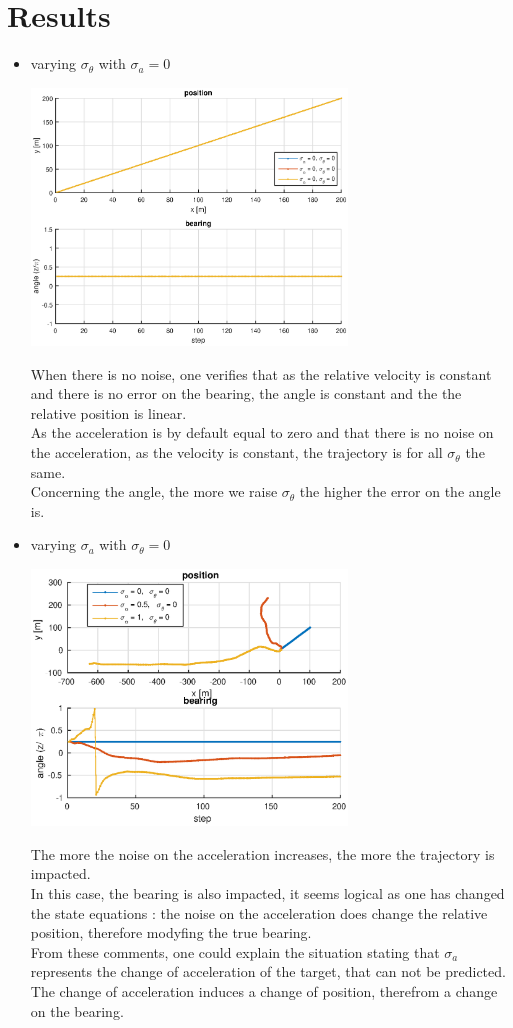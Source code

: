 \documentclass[english,DIV=13]{scrreprt}
\begin{document}
\section*{Results}
\begin{itemize}
\item varying $\sigma_\theta$ with $\sigma_a=0$
\begin{center}	
\includegraphics[width=0.66\textwidth]{img/q2_1.eps}
\end{center}
When there is no noise, one verifies that as the relative velocity is constant and there is no error on
the bearing, the angle is constant and the the relative position is linear.\\
As the acceleration is by default equal to zero and that there is no noise on the acceleration, as the velocity is
constant, the trajectory is for all $\sigma_{\theta}$ the same.\\
Concerning the angle, the more we raise $\sigma_{\theta}$ the higher the error on the angle is.

\item varying $\sigma_a$ with $\sigma_\theta=0$
\begin{center}
\includegraphics[width=0.66\textwidth]{img/q2_2.eps}
\end{center}
The more the noise on the acceleration increases, the more the trajectory is impacted. \\
In this case, the bearing is also impacted, it seems logical as one has changed the state equations :
the noise on the acceleration does change the relative position, therefore modyfing the true bearing. \\
From these comments, one could explain the situation stating that $\sigma_a$ represents the change of 
acceleration of the target, that can not be predicted. The change of acceleration induces a change
of position, therefrom a change on the bearing.



\end{itemize}
\end{document}
